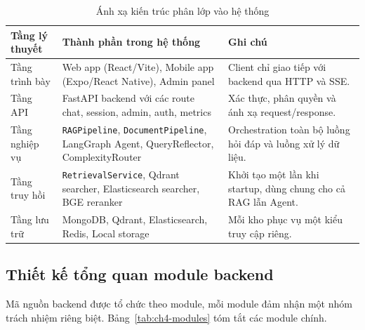 \documentclass[../DoAn.tex]{subfiles}
\begin{document}
\begin{table}[H]
\centering
\small
\begin{tabular}{|p{3.2cm}|p{5.5cm}|p{5.0cm}|}
\hline
\textbf{Tầng lý thuyết} & \textbf{Thành phần trong hệ thống} & \textbf{Ghi chú} \\
\hline
Tầng trình bày & Web app (React/Vite), Mobile app (Expo/React Native), Admin
panel & Client chỉ giao tiếp với backend qua HTTP và SSE. \\
\hline
Tầng API & FastAPI backend với các route chat, session, admin, auth, metrics &
Xác thực, phân quyền và ánh xạ request/response. \\
\hline
Tầng nghiệp vụ & \texttt{RAGPipeline}, \texttt{DocumentPipeline}, LangGraph
Agent, QueryReflector, ComplexityRouter & Orchestration toàn bộ luồng hỏi đáp
và luồng xử lý dữ liệu. \\
\hline
Tầng truy hồi & \texttt{RetrievalService}, Qdrant searcher, Elasticsearch
searcher, BGE reranker & Khởi tạo một lần khi startup, dùng chung cho cả
RAG lẫn Agent. \\
\hline
Tầng lưu trữ & MongoDB, Qdrant, Elasticsearch, Redis, Local storage & Mỗi kho
phục vụ một kiểu truy cập riêng. \\
\hline
\end{tabular}
\caption{Ánh xạ kiến trúc phân lớp vào hệ thống}
\label{tab:ch4-layer-mapping}
\end{table}

\subsection{Thiết kế tổng quan module backend}

Mã nguồn backend được tổ chức theo module, mỗi module đảm nhận một nhóm trách
nhiệm riêng biệt. Bảng~\ref{tab:ch4-modules} tóm tắt các module chính.
\end{document}
